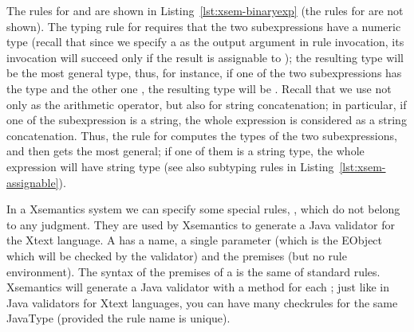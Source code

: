 

The rules for  and  are shown in
Listing~\ref{lst:xsem-binaryexp} (the rules for  are not
shown).
The typing rule for  requires that the two subexpressions have a
numeric type (recall that since we specify a  as the output
argument in rule invocation, its invocation will succeed only if the result is
assignable to ); the resulting type will be the most general
type, thus, for instance, if one of the two subexpressions has the type
 and the other one , the resulting type will be
.  Recall that we use \mytt{+} not only as the arithmetic
operator, but also for string concatenation; in particular, if one of the
subexpression is a string, the whole expression is considered as a string
concatenation.  Thus, the rule for  computes the types of the two
subexpressions, and then gets the most general; if one of them is a string type,
the whole expression will have string type (see also subtyping rules in
Listing~\ref{lst:xsem-assignable}).


In a Xsemantics system we can specify some special rules,
, which do not belong to any judgment. They are used by
Xsemantics to generate a Java validator for the Xtext language.  A
 has a name, a single parameter (which is the EObject which will
be checked by the validator) and the premises (but no rule environment).  The
syntax of the premises of a  is the same of standard rules.
Xsemantics will generate a Java validator with a \checkm{} method for each
; just like in Java validators for Xtext languages, you can have
many checkrules for the same JavaType (provided the rule name is unique).

